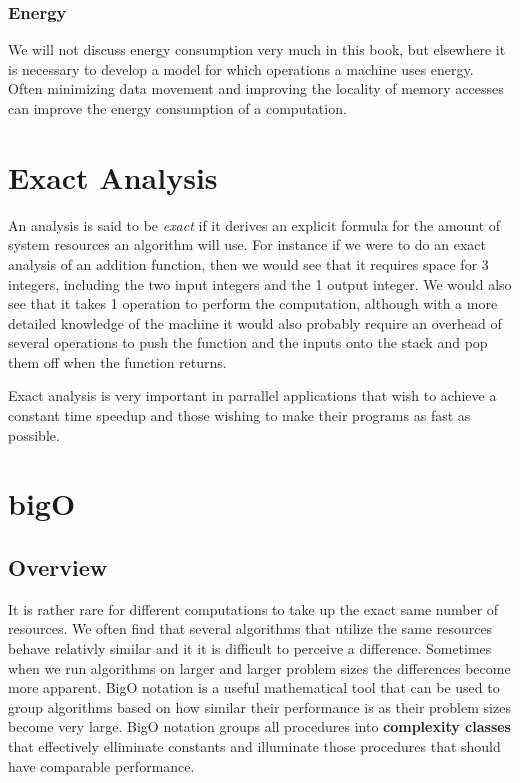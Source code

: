 \documentclass[12pt, letterpaper]{book}
\begin{document}
\subsubsection{Energy}
	We will not discuss energy consumption very much in this book, but elsewhere it is necessary to develop a model for which operations a machine uses energy. Often minimizing data movement and improving the locality of memory accesses can improve the energy consumption of a computation.

		\section{Exact Analysis}

An analysis is said to be \textit{exact} if it derives an explicit formula for the amount of system resources an algorithm will use. For instance if we were to do an exact analysis of an addition function, then we would see that it requires space for 3 integers, including the two input integers and the 1 output integer. We would also see that it takes 1 operation to perform the computation, although with a more detailed knowledge of the machine it would also probably require an overhead of several operations to push the function and the inputs onto the stack and pop them off when the function returns.

Exact analysis is very important in parrallel applications that wish to achieve a constant time speedup and those wishing to make their programs as fast as possible.

\newpage

	\section{bigO} \label{bigO}
	\subsection{Overview}
	It is rather rare for different computations to take up the exact same number of resources. We often find that several algorithms that utilize the same resources behave relativly similar and it it is difficult to perceive a difference. Sometimes when we run algorithms on larger and larger problem sizes the differences become more apparent. BigO notation is a useful mathematical tool that can be used to group algorithms based on how similar their performance is as their problem sizes become very large. BigO notation groups all procedures into \textbf{complexity classes} that effectively elliminate constants and illuminate those procedures that should have comparable performance. 
\end{document}
